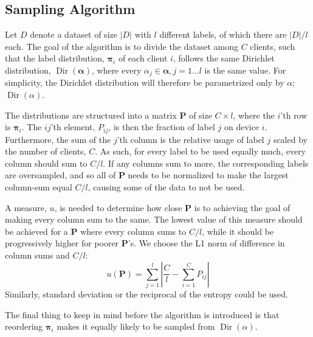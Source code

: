 \documentclass{article}
\newcommand{\len}[1]{\ensuremath{\left\lvert#1\right\rvert}}
\begin{document}
\subsection{Sampling Algorithm}%
\label{app:diralg}
Let $D$ denote a dataset of size $\len D$ with $l$ different labels, of which there are $\len D/l$ each.
The goal of the algorithm is to divide the dataset among $C$ clients, such that the label distribution, $\bm\pi_i$ of each client $i$, follows the same Dirichlet distribution, $\operatorname{Dir}(\bm\alpha)$, where every $\alpha_j\in\bm\alpha, j=1\ldots l$ is the same value.
For simplicity, the Dirichlet distribution will therefore be parametrized only by $\alpha$; $\operatorname{Dir}(\alpha)$.

The distributions are structured into a matrix $\mathbf P$ of size $ C\times l $, where the $i$'th row is $\bm\pi_i$.
The $ij$'th element, $P_{ij}$, is then the fraction of label $j$ on device $i$.
Furthermore, the sum of the $j$'th column is the relative usage of label $j$ scaled by the number of clients, $C$.
As such, for every label to be used equally much, every column should sum to $C/l$.
If any columns sum to more, the corresponding labels are oversampled, and so all of $\bm P$ needs to be normalized to make the largest column-sum equal $C/l$, causing some of the data to not be used.

A measure, $u$, is needed to determine how close $\mathbf P$ is to achieving the goal of making every column sum to the same.
The lowest value of this measure should be achieved for a $\mathbf P$ where every column sums to $C/l$, while it should be progressively higher for poorer $\mathbf P$'s.
We choose the L1 norm of difference in column sums and $C/l$:
\begin{equation*}
    u(\mathbf P) = \sum_{j=1}^{l} \len{\frac{C}{l} - \sum_{i=1}^{C} P_{ij}}
\end{equation*}
Similarly, standard deviation or the reciprocal of the entropy could be used.

The final thing to keep in mind before the algorithm is introduced is that reordering $\bm\pi_i$ makes it equally likely to be sampled from $ \operatorname{Dir}(\alpha) $.
\end{document}
